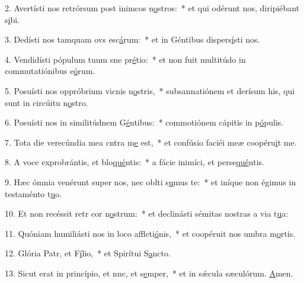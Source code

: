 2. Avertísti nos retrórsum post inimcos n\uline{o}stros:~* et qui odérunt nos, diripiébant s\uline{i}bi.\par 
3. Dedísti nos tamquam ovs esc\uline{á}rum:~* et in Géntibus dispers\uline{í}sti nos.\par 
4. Vendidísti pópulum tuum sne pr\uline{é}tio:~* et non fuit multitúdo in commutatiónibus e\uline{ó}rum.\par 
5. Posuísti nos oppróbrium vicnis n\uline{o}stris,~* subsannatiónem et derísum his, qui sunt in circúitu n\uline{o}stro.\par 
6. Posuísti nos in similitúdnem G\uline{é}ntibus:~* commotiónem cápitis in p\uline{ó}pulis.\par 
7. Tota die verecúndia mea cntra m\uline{e} est,~* et confúsio faciéi meæ coopéru\uline{i}t me.\par 
8. A voce exprobrántis, et blo\uline{qué}ntis:~* a fácie inimíci, et perse\uline{qué}ntis.\par 
9. Hæc ómnia venérunt super nos, nec oblti s\uline{u}mus te:~* et iníque non égimus in testaménto t\uline{u}o.\par 
10. Et non recéssit retr cor n\uline{o}strum:~* et declinásti sémitas nostras a via t\uline{u}a:\par 
11. Quóniam humiliásti nos in loco afflcti\uline{ó}nis,~* et coopéruit nos umbra m\uline{o}rtis.\par 
12. Glória Patr, et F\uline{í}lio,~* et Spirítui S\uline{a}ncto.\par 
13. Sicut erat in princípio, et nnc, et s\uline{e}mper,~* et in sǽcula sæculórum. \uline{A}men.\par 
